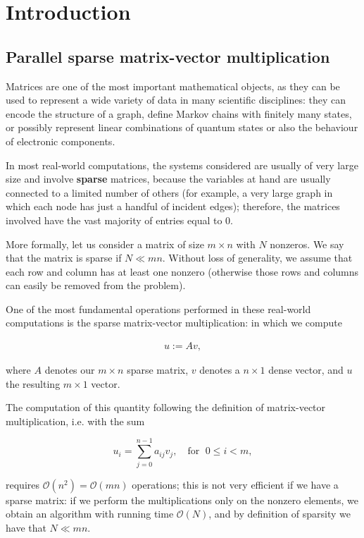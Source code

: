 \chapter{Introduction}
\section{Parallel sparse matrix-vector multiplication}
Matrices are one of the most important mathematical objects, as they can be used to represent a wide variety of data in many scientific disciplines: they can encode the structure of a graph, define Markov chains with finitely many states, or possibly represent linear combinations of quantum states or also the behaviour of electronic components. 

In most real-world computations, the systems considered are usually of very large size and involve \textbf{sparse} matrices, because the variables at hand are usually connected to a limited number of others (for example, a very large graph in which each node has just a handful of incident edges); therefore, the matrices involved have the vast majority of entries equal to 0.

More formally, let us consider a matrix of size $m \times n$ with $N$ nonzeros. We say that the matrix is sparse if $ N \ll mn $. Without loss of generality, we assume that each row and column has at least one nonzero (otherwise those rows and columns can easily be removed from the problem).

One of the most fundamental operations performed in these real-world computations is the sparse matrix-vector multiplication: in which we compute

\begin{align}
	u:=Av,
	\label{uAv}
\end{align}

where $A$ denotes our $m \times n$ sparse matrix, $v$ denotes a $n \times 1$ dense vector, and $u$ the resulting $m \times 1$ vector.

The computation of this quantity following the definition of matrix-vector multiplication, i.e. with the sum 

\[ 
	u_i = \sum_{j=0}^{n-1} a_{ij} v_j, \quad \text{for }\; 0 \leq i < m,
\]

requires $\mathcal{O}(n^2) = \mathcal{O}(mn)$ operations; this is not very efficient if we have a sparse matrix: if we perform the multiplications only on the nonzero elements, we obtain an algorithm with running time $\mathcal{O}(N)$, and by definition of sparsity we have that $N \ll mn$.

